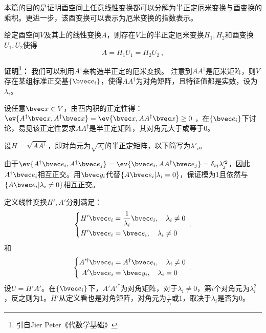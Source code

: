 

本篇的目的是证明酉空间上任意线性变换都可以分解为半正定厄米变换与酉变换的乘积。更进一步，该酉变换可以表示为厄米变换的指数表示。
\begin{theorem}{}\label{the_PoDe_2}
给定酉空间$V$及其上的线性变换$A$，则存在$V$上的半正定厄米变换$H_1,H_2$和酉变换$U_1,U_2$使得
\begin{equation}
A=H_1U_1=H_2U_2~,
\end{equation}
\end{theorem}
\textbf{证明\footnote{引自Jier Peter《代数学基础》}：}
我们可以利用$A^{\dagger}$来构造半正定的厄米变换。
注意到$AA^{\dagger}$是厄米矩阵，则$V$存在某组标准正交基$\{\bvec e_i\}$，使得$AA^{\dagger}$为对角矩阵，且特征值都是实数，设为$\lambda_i$。

设任意$\bvec x\in V$，由酉内积的正定性得：$\ev{A^{\dagger}\bvec x,A^{\dagger}\bvec x}=\ev{\bvec x,AA^{\dagger}\bvec x}\ge 0$
，在$\{\bvec e_i\}$下讨论，易见该正定性要求$AA^{\dagger}$是半正定矩阵，其对角元大于或等于0。

设$H=\sqrt{AA^{\dagger}}$，即对角元为$\sqrt{\lambda_i}$的半正定矩阵，以下简写为$\lambda'_i$。

由于$\ev{A^{\dagger}\bvec e_i,A^{\dagger}\bvec e_j}=\ev{\bvec e_i,AA^{\dagger}\bvec e_j}=\delta_{ij}\lambda'^2_j$，因此$A^{\dagger}\bvec e_i$相互正交。用$\bvec y_i$代替$\{A\bvec e_i|\lambda_i=0\}$，保证模为1且依然与$\{A\bvec e_i|\lambda_i\neq 0\}$相互正交。

定义线性变换$H',A'$分别满足：
\begin{equation}
\left\{
    \begin{aligned}
    H'\bvec e_i&=\frac{1}{\lambda_i}\bvec e_i,\quad\lambda_i\neq 0\\
    H'\bvec e_i&=\bvec e_i,\quad\lambda_i\neq 0
    \end{aligned}
    \right.~.
\end{equation}
和
\begin{equation}
\left\{
    \begin{aligned}
    A'^{\dagger}\bvec e_i&=A^{\dagger}\bvec e_i,\quad\lambda_i\neq 0\\
    A'\bvec e_i&=\bvec y_i,\quad\lambda_i= 0
    \end{aligned}
    \right.~.
\end{equation}
设$U=H'A'$。在$\{\bvec e_i\}$下，$A'A'^{\dagger}$为对角矩阵，对于$\lambda_i\neq 0$，第$i$个对角元为$\lambda_i^2$，反之则为1。$H'$从定义看也是对角矩阵，对角元为$\frac{1}{\lambda_i}$或$1$，取决于$\lambda_i$是否为0。

